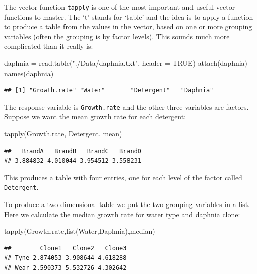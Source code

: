 \documentclass[
]{book}
\newenvironment{Shaded}{\begin{snugshade}}{\end{snugshade}}
\newcommand{\AttributeTok}[1]{\textcolor[rgb]{0.77,0.63,0.00}{#1}}
\newcommand{\ConstantTok}[1]{\textcolor[rgb]{0.00,0.00,0.00}{#1}}
\newcommand{\FunctionTok}[1]{\textcolor[rgb]{0.00,0.00,0.00}{#1}}
\newcommand{\NormalTok}[1]{#1}
\newcommand{\OtherTok}[1]{\textcolor[rgb]{0.56,0.35,0.01}{#1}}
\newcommand{\StringTok}[1]{\textcolor[rgb]{0.31,0.60,0.02}{#1}}
\theoremstyle{definition}
\theoremstyle{definition}
\theoremstyle{definition}
\theoremstyle{definition}
\theoremstyle{remark}
\begin{document}
The vector function \texttt{tapply} is one of the most important and useful vector functions to master. The `t' stands for `table' and the idea is to apply a function to produce a table from the values in the vector, based on one or more grouping variables (often the grouping is by factor levels). This sounds much more complicated than it really is:

\begin{Shaded}
\begin{Highlighting}[]
\NormalTok{daphnia }\OtherTok{=} \FunctionTok{read.table}\NormalTok{(}\StringTok{"./Data/daphnia.txt"}\NormalTok{, }\AttributeTok{header =} \ConstantTok{TRUE}\NormalTok{)}
\FunctionTok{attach}\NormalTok{(daphnia)}
\FunctionTok{names}\NormalTok{(daphnia)}
\end{Highlighting}
\end{Shaded}

\begin{verbatim}
## [1] "Growth.rate" "Water"       "Detergent"   "Daphnia"
\end{verbatim}

The response variable is \texttt{Growth.rate} and the other three variables are factors. Suppose we want the mean growth rate for each detergent:

\begin{Shaded}
\begin{Highlighting}[]
\FunctionTok{tapply}\NormalTok{(Growth.rate, Detergent, mean)}
\end{Highlighting}
\end{Shaded}

\begin{verbatim}
##   BrandA   BrandB   BrandC   BrandD 
## 3.884832 4.010044 3.954512 3.558231
\end{verbatim}

This produces a table with four entries, one for each level of the factor called \texttt{Detergent}.

To produce a two-dimensional table we put the two grouping variables in a list. Here we calculate the median growth rate for water type and daphnia clone:

\begin{Shaded}
\begin{Highlighting}[]
\FunctionTok{tapply}\NormalTok{(Growth.rate,}\FunctionTok{list}\NormalTok{(Water,Daphnia),median)}
\end{Highlighting}
\end{Shaded}

\begin{verbatim}
##        Clone1   Clone2   Clone3
## Tyne 2.874053 3.908644 4.618288
## Wear 2.590373 5.532726 4.302642
\end{verbatim}
\end{document}
